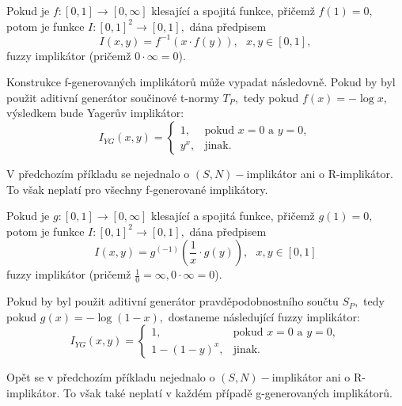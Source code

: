 \begin{sentence}\cite{yager} 
Pokud je $f: [0,1] \to [0,\infty]$ klesající a spojitá funkce,
přičemž $f(1) = 0,$ potom je funkce $I: [0,1]^2 \to [0,1],$ dána předpisem
$$I(x,y) = f^{-1}(x \cdot f(y)), \mbox {   } x, y \in [0,1],$$
fuzzy implikátor (pričemž $0 \cdot \infty = 0$). \\
\end{sentence}

\begin{example}
    \cite{Springer}
    Konstrukce f-generovaných implikátor\r u m\r uže vypadat následovně.
    Pokud by byl použit aditivní generátor součinové t-normy $T_P,$ tedy 
    pokud $f(x) = - \log x,$ výsledkem bude Yager\r uv implikátor:
    $$I_{YG}(x,y)= \begin{cases} 1,
    &\mbox {pokud $x=0$ a $y=0,$} \\
    y^x, &\mbox {jinak.}
    \end{cases}$$
\end{example}
\begin{remark}
    V předchozím příkladu se nejednalo o $(S,N)-$implikátor ani o R-implikátor. To však neplatí pro všechny f-generované implikátory.
\end{remark}


\begin{sentence}\cite{yager} 
Pokud je $g: [0,1] \to [0,\infty]$ klesající a spojitá funkce,
přičemž $g(1) = 0,$ potom je funkce $I: [0,1]^2 \to [0,1],$ dána předpisem
$$I(x,y) = g^{(-1)}\left (\frac 1x \cdot g(y)\right ), \mbox {   } x, y \in [0,1]$$
fuzzy implikátor (pričemž $\frac{1}{0} = \infty, 0 \cdot \infty = 0$). \\
\end{sentence}
\begin{example}
    \cite{Springer}
    Pokud by byl použit aditivní generátor pravděpodobnostního součtu $S_P,$ tedy 
    pokud $g(x) = - \log (1- x),$ dostaneme následující fuzzy implikátor:
    $$I_{YG}(x,y)= \begin{cases} 1,
    &\mbox {pokud $x=0$ a $y=0,$} \\
    1-(1-y)^x, &\mbox {jinak.}
        \end{cases}$$
\end{example}
\begin{remark}
    Opět se v předchozím příkladu nejednalo o $(S,N)-$implikátor ani o R-implikátor. To však také neplatí v každém případě g-generovaných implikátor\r u.
\end{remark}

